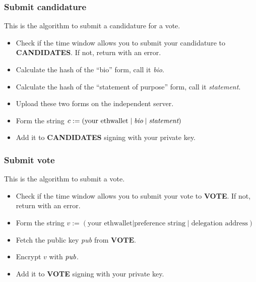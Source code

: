 \documentclass[submission, copyright,creativecommons,sharealike,noncommercial]{eptcs}
\newcommand{\Candidates}{\textbf{CANDIDATES}\xspace}
\newcommand{\Vote}{\textbf{VOTE}\xspace}
\begin{document}
\subsubsection{Submit candidature}\label{subsubsec:submit candidature}
	This is the algorithm to submit a candidature for a vote.
	\begin{itemize}
		\item Check if the time window allows you to submit your candidature to \Candidates. If not, return with an error.
		\item Calculate the hash of the ``bio'' form, call it \emph{bio}.
		\item Calculate the hash of the ``statement of purpose'' form, call it \emph{statement}.
		\item Upload these two forms on the independent server.
		\item Form the string $c:= (\text{your ethwallet} \mid \emph{bio} \mid \emph{statement})$
		\item Add it to \Candidates signing with your private key.	
	\end{itemize}

\subsubsection{Submit vote}\label{subsubsec:submit vote}
	This is the algorithm to submit a vote.
	\begin{itemize}
		\item Check if the time window allows you to submit your vote to \Vote. If not, return with an error.
		\item Form the string $v:= (\text{your ethwallet} | \text{preference string} \mid \text{delegation address})$
		\item Fetch the public key \emph{pub} from $\Vote$. 
		\item Encrypt $v$ with $\emph{pub}$.
		\item Add it to \Vote signing with your private key.	
	\end{itemize}
		
\end{document}
